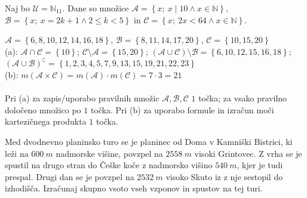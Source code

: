 \documentclass[addpoints]{exam}
\begin{document}
\begin{questions}
    \newpage

    \question
    Naj bo $\mathcal{U}=\mathbb{N}_{11}$. Dane so množice $\mathcal{A}=\left\{x;\ x\mid 10 \land x\in\mathbb{N}\right\}$, $\mathcal{B}=\left\{x;\ x=2k+1 \land 2\leq k< 5\right\}$ in $\mathcal{C}=\left\{x;\ 2x<64 \land x\in\mathbb{N}\right\}$. 

    \begin{solution}[13cm]
        $\mathcal{A}=\left\{6,8,10,12,14,16,18\right\}$, $\mathcal{B}=\left\{8,11,14,17,20\right\}$, $\mathcal{C}=\left\{10,15,20\right\}$ \\
        (a): $\mathcal{A}\cap\mathcal{C}=\left\{10\right\}$; $\mathcal{C}\setminus\mathcal{A}=\left\{15,20\right\}$; $(\mathcal{A}\cup\mathcal{C})\setminus\mathcal{B}=\left\{6,10,12,15,16,18\right\}$; $(\mathcal{A}\cup\mathcal{B})^\complement=\left\{1,2,3,4,5,7,9,13,15,19,21,22,23\right\}$ \\
        (b): $m(\mathcal{A}\times\mathcal{C})=m(\mathcal{A})\cdot m(\mathcal{C})=7\cdot 3 = 21$ \\ \\
        Pri (a) za zapis/uporabo pravilnih množic $\mathcal{A}, \mathcal{B}, \mathcal{C}$ $1$ točka; za vsako pravilno določeno množico po $1$ točka. Pri (b) za uporabo formule in izračun moči kartezičnega produkta $1$ točka.
    \end{solution}


        

    \question[4]
    Med dvodnevno planinsko turo se je planinec od Doma v Kamniški Bistrici, ki leži na $600~m$ 
    nadmorske višine, povzpel na $2558~m$ visoki Grintovec. Z vrha se je spustil na 
    drugo stran do Češke koče z nadmorsko višino $540~m$, kjer je tudi prespal. Drugi dan se 
    je povzpel na $2532~m$ visoko Skuto iz z nje sestopil do izhodišča. Izračunaj skupno vsoto 
    vseh vzponov in spustov na tej turi.


\end{questions}
\end{document}
